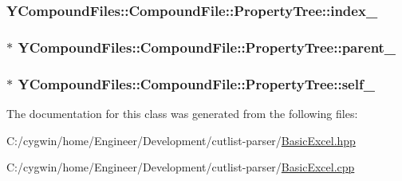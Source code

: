 \subsubsection[{index\+\_\+}]{ Y\+Compound\+Files\+::\+Compound\+File\+::\+Property\+Tree\+::index\+\_\+}\label{class_y_compound_files_1_1_compound_file_1_1_property_tree_a128d03a9c1689e43e93fc503cbad1c45}
\hypertarget{class_y_compound_files_1_1_compound_file_1_1_property_tree_ab4b34fb99188d2168503da9a0a4bc9b3}{}
\subsubsection[{parent\+\_\+}]{ $\ast$ Y\+Compound\+Files\+::\+Compound\+File\+::\+Property\+Tree\+::parent\+\_\+}\label{class_y_compound_files_1_1_compound_file_1_1_property_tree_ab4b34fb99188d2168503da9a0a4bc9b3}
\hypertarget{class_y_compound_files_1_1_compound_file_1_1_property_tree_a1f7dcf5af163cf6f2fab8db80a2cd562}{}
\subsubsection[{self\+\_\+}]{ $\ast$ Y\+Compound\+Files\+::\+Compound\+File\+::\+Property\+Tree\+::self\+\_\+}\label{class_y_compound_files_1_1_compound_file_1_1_property_tree_a1f7dcf5af163cf6f2fab8db80a2cd562}


The documentation for this class was generated from the following files\+:\begin{DoxyCompactItemize}
\item 
C\+:/cygwin/home/\+Engineer/\+Development/cutlist-\/parser/\hyperlink{_basic_excel_8hpp}{Basic\+Excel.\+hpp}\item 
C\+:/cygwin/home/\+Engineer/\+Development/cutlist-\/parser/\hyperlink{_basic_excel_8cpp}{Basic\+Excel.\+cpp}\end{DoxyCompactItemize}
